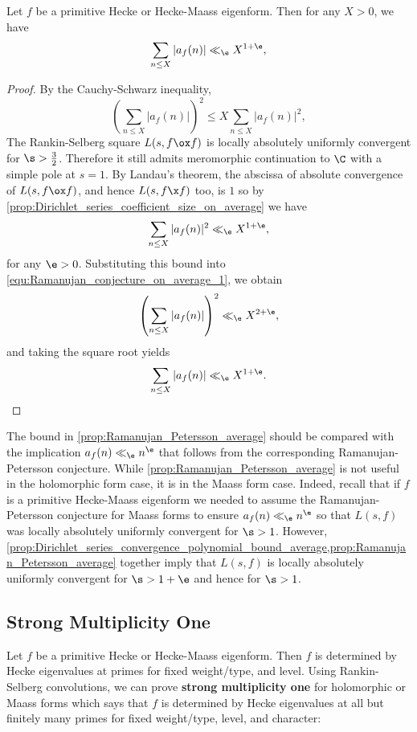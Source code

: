       \begin{proposition}\label{prop:Ramanujan_Petersson_average}
        Let $f$ be a primitive Hecke or Hecke-Maass eigenform. Then for any $X > 0$, we have
        \[
        \sum_{n \le X}|a_{f}(n)| \ll_{\e} X^{1+\e},
        \]
      \end{proposition}
      \begin{proof}
        By the Cauchy-Schwarz inequality,
        \begin{equation}\label{equ:Ramanujan_conjecture_on_average_1}
          \left(\sum_{n \le X}|a_{f}(n)|\right)^{2} \le X\sum_{n \le X}|a_{f}(n)|^{2},
        \end{equation}
        The Rankin-Selberg square $L(s,f \ox f)$ is locally absolutely uniformly convergent for $\s > \frac{3}{2}$. Therefore it still admits meromorphic continuation to $\C$ with a simple pole at $s = 1$. By Landau's theorem, the abscissa of absolute convergence of $L(s,f \ox f)$, and hence $L(s,f \x f)$ too, is $1$ so by \cref{prop:Dirichlet_series_coefficient_size_on_average} we have
        \[
          \sum_{n \le X}|a_{f}(n)|^{2} \ll_{\e} X^{1+\e},
        \]
        for any $\e > 0$. Substituting this bound into \cref{equ:Ramanujan_conjecture_on_average_1}, we obtain
        \[
          \left(\sum_{n \le X}|a_{f}(n)|\right)^{2} \ll_{\e} X^{2+\e},
        \]
        and taking the square root yields
        \[
          \sum_{n \le X}|a_{f}(n)| \ll_{\e} X^{1+\e}.
        \]
      \end{proof}
      
      The bound in \cref{prop:Ramanujan_Petersson_average} should be compared with the implication $a_{f}(n) \ll_{\e} n^{\e}$ that follows from the corresponding Ramanujan-Petersson conjecture. While \cref{prop:Ramanujan_Petersson_average} is not useful in the holomorphic form case, it is in the Maass form case. Indeed, recall that if $f$ is a primitive Hecke-Maass eigenform we needed to assume the Ramanujan-Petersson conjecture for Maass forms to ensure $a_{f}(n) \ll_{\e} n^{\e}$ so that $L(s,f)$ was locally absolutely uniformly convergent for $\s > 1$. However, \cref{prop:Dirichlet_series_convergence_polynomial_bound_average,prop:Ramanujan_Petersson_average} together imply that $L(s,f)$ is locally absolutely uniformly convergent for $\s > 1+\e$ and hence for $\s > 1$.
    \subsection*{Strong Multiplicity One}
      Let $f$ be a primitive Hecke or Hecke-Maass eigenform. Then $f$ is determined by Hecke eigenvalues at primes for fixed weight/type, and level. Using Rankin-Selberg convolutions, we can prove \textbf{strong multiplicity one} for holomorphic or Maass forms which says that $f$ is determined by Hecke eigenvalues at all but finitely many primes for fixed weight/type, level, and character:

